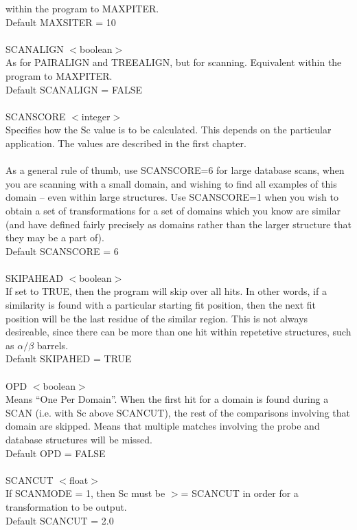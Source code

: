 within the program to MAXPITER.\\
Default MAXSITER = 10\\
\\
SCANALIGN $<$boolean$>$\\
As for PAIRALIGN and TREEALIGN, but for scanning.  Equivalent
within the program to MAXPITER.\\
Default SCANALIGN = FALSE\\
\\
SCANSCORE $<$integer$>$\\
Specifies how the Sc value is to be calculated.  This depends on
the particular application.  The values are described in the
first chapter.\\
\\
As a general rule of thumb, use SCANSCORE=6 for large database
scans, when you are scanning with a small domain, and wishing to
find all examples of this domain -- even within large structures. 
Use SCANSCORE=1 when  you wish to obtain a set of
transformations for a set of domains which you know are similar
(and have defined fairly precisely as domains rather than the
larger structure that they may be a part of).\\
Default SCANSCORE = 6\\
\\
SKIPAHEAD $<$boolean$>$\\
If set to TRUE, then the program will skip over all hits.  In
other words, if a similarity is found with a particular starting
fit position, then the next fit position will be the last residue
of the similar region.  This is not always desireable, since there can
be more than one hit within  repetetive structures, such as $\alpha/\beta$ barrels.\\
Default SKIPAHED = TRUE\\
\\
OPD $<$boolean$>$\\
Means ``One Per Domain''.  When the first hit for a domain is found during a SCAN
(i.e. with Sc above SCANCUT), the rest of the comparisons involving that domain
are skipped.  Means that multiple matches involving the probe and database structures
will be missed.\\
Default OPD = FALSE\\
\\
SCANCUT $<$float$>$\\
If SCANMODE = 1, then Sc must be $>$= SCANCUT in order for a 
transformation to be output.\\
Default SCANCUT = 2.0\\
